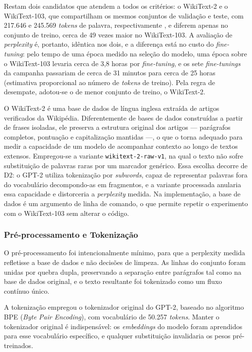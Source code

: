 Restam dois candidatos que atendem a todos os critérios: o WikiText-2 e o WikiText-103, que
compartilham os mesmos conjuntos de validação e teste, com 217.646 e 245.569 \textit{tokens} de palavra,
respectivamente \cite{Merity2017}, e diferem apenas no conjunto de treino, cerca de 49 vezes
maior no WikiText-103. A avaliação de \textit{perplexity} é, portanto, idêntica nos dois, e
a diferença está no custo do \textit{fine-tuning}: pelo tempo de uma época medido na
seleção do modelo, uma época sobre o WikiText-103 levaria cerca de 3,8 horas por
\textit{fine-tuning}, e os sete \textit{fine-tunings} da campanha passariam de cerca de 31
minutos para cerca de 25 horas (estimativa proporcional ao número de \textit{tokens} de
treino). Pela regra de desempate, adotou-se o de menor
conjunto de treino, o WikiText-2.

O WikiText-2 é uma base de dados de língua inglesa extraída de artigos verificados da
Wikipédia. Diferentemente de bases de dados construídas a partir de frases isoladas, ele
preserva a estrutura original dos artigos --- parágrafos completos, pontuação e
capitalização mantidas ---, o que o torna adequado para medir a capacidade de um modelo de
acompanhar contexto ao longo de textos extensos. Empregou-se a variante
\texttt{wikitext-2-raw-v1}, na qual o texto não sofre substituição de palavras raras por um
marcador genérico. Essa escolha decorre de D2: o GPT-2 utiliza tokenização por
\textit{subwords}, capaz de representar palavras fora do vocabulário decompondo-as em
fragmentos, e a variante processada anularia essa capacidade e distorceria a
\textit{perplexity} medida. Na implementação, a base de dados é um argumento de linha de
comando, o que permite repetir o experimento com o WikiText-103 sem alterar o código.

\subsubsection{Pré-processamento e Tokenização}\label{subsec:preprocessamento}

O pré-processamento foi intencionalmente mínimo, para que a perplexity medida refletisse a
base de dados e não decisões de limpeza. As linhas do conjunto foram unidas por quebra dupla,
preservando a separação entre parágrafos tal como na base de dados original, e o texto resultante
foi tokenizado como um fluxo contínuo único.

A tokenização empregou o tokenizador original do GPT-2, baseado no algoritmo BPE
(\textit{Byte Pair Encoding}), com vocabulário de 50.257 \textit{tokens}. Manter o
tokenizador original é indispensável: os \textit{embeddings} do modelo foram aprendidos
para esse vocabulário específico, e qualquer substituição invalidaria os pesos
pré-treinados.

